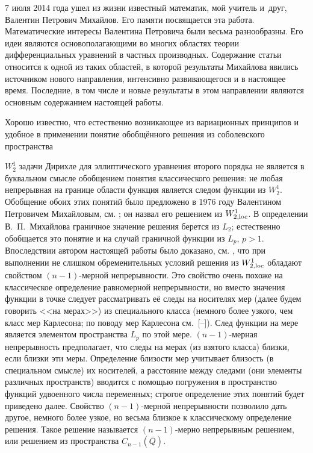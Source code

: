 \date{19/XII/2014} %





\makerutitle





7 июля 2014 года ушел из жизни известный математик, мой учитель и~друг, Валентин Петрович Михайлов. Его  памяти посвящается эта работа. Математические интересы Валентина Петровича были весьма разнообразны. Его идеи являются основополагающими во многих областях теории дифференциальных уравнений в частных производных. Содержание статьи относится к одной из таких областей, в которой результаты Михайлова явились источником нового направления, интенсивно развивающегося и в настоящее время. Последние, в том числе и новые результаты в этом направлении являются основным содержанием настоящей работы.



Хорошо известно, что естественно возникающее из вариационных принципов и удобное в применении понятие обобщённого решения из соболевского пространства

$W_2^1$ задачи Дирихле для эллиптического уравнения второго порядка не является в буквальном смысле обобщением понятия классического решения: не любая непрерывная на границе области функция является следом функции из $W_2^1$. Обобщение обоих этих понятий  было предложено в 1976 году Валентином Петровичем Михайловым, см. \cite{gushin:M76}; он назвал его решением из $W^1_{2, {\rm loc}}$. В определении В.~П.~Михайлова граничное значение решения берется из $L_2$; естественно обобщается это понятие и на случай граничной функции из $L_p$, $ p > 1$. Впоследствии автором настоящей работы было доказано, см. \cite{gushin:G88}, что при выполнении не слишком обременительных условий решения из $W^1_{2, {\rm loc}}$ обладают свойством $(n-1)$-мерной непрерывности. Это свойство очень похоже на классическое определение равномерной непрерывности, но вместо значения функции в точке следует рассматривать её следы на носителях мер (далее будем говорить <<на мерах>>) из специального класса (немного более узкого, чем класс мер Карлесона; по поводу мер Карлесона см.~[--]). След функции на мере является элементом пространства $L_p$ по этой мере. $(n-1)$-мерная непрерывность предполагает, что следы на мерах (из взятого класса) близки, если близки эти меры. Определение близости мер учитывает близость (в специальном смысле) их носителей, а расстояние между следами (они элементы различных пространств) вводится с помощью погружения в пространство функций удвоенного числа переменных; строгое определение этих понятий будет приведено далее. Свойство $(n-1)$-мерной непрерывности позволило дать другое, немного более узкое, но весьма близкое к классическому определение решения. Такое решение называется $(n-1)$-мерно непрерывным решением, или решением из пространства $C_{n-1}(\bar{Q})$.



